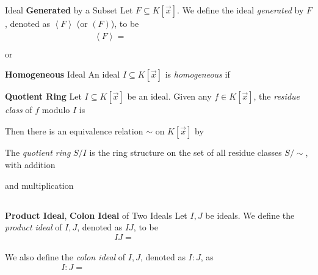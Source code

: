 \documentclass[11pt]{article}
\begin{document}
    \begin{definition}{Ideal \textbf{Generated} by a Subset}
        Let $F\subseteq K\left[ \vec{x} \right]$. We define the ideal \emph{generated} by $F$, denoted as $\left< F \right>$ (or $\left( F \right)$), to be
        \begin{equation*}
            \left< F \right> = \phantom{\bigcap^{}_{} \left\lbrace I\supseteq F: \text{$I$ is an ideal} \right\rbrace}
        \end{equation*}
        or 
    \end{definition}
    
    \begin{definition}{\textbf{Homogeneous} Ideal}
        An ideal $I\subseteq K\left[ \vec{x} \right]$ is \emph{homogeneous} if 
    \end{definition}
    
    \begin{definition}{\textbf{Quotient Ring}}
        Let $I\subseteq K\left[ \vec{x} \right]$ be an ideal. Given any $f\in K\left[ \vec{x} \right]$, the \emph{residue class} of $f$ modulo $I$ is
        \begin{equation*}
            \phantom{f+I = \left\lbrace f+i: i\in I \right\rbrace}
        \end{equation*}
        Then there is an equivalence relation $\sim$ on $K\left[ \vec{x} \right]$ by
        \begin{equation*}
            \phantom{f\sim g \iff f+I = g+I}
        \end{equation*}
        The \emph{quotient ring} $S /I$ is the ring structure on the set of all residue classes $S /\sim$, with addition
        \begin{equation*}
            \phantom{\left( f+I \right) + \left( g+I \right) = \left( f+g \right) + I}
        \end{equation*}
        and multiplication
        \begin{equation*}
            \phantom{\left( f+I \right)\left( g+I \right) = fg+I}
        \end{equation*}
    \end{definition}
    
    \begin{definition}{\textbf{Product Ideal}, \textbf{Colon Ideal} of Two Ideals}
        Let $I,J$ be ideals. We define the \emph{product ideal} of $I,J$, denoted as $IJ$, to be
        \begin{equation*}
            IJ = \phantom{\left< fg: f\in I, g\in J \right>}
        \end{equation*}

        We also define the \emph{colon ideal} of $I,J$, denoted as $I:J$, as
        \begin{equation*}
            I:J = \phantom{\left\lbrace f\in S: \forall j\in J\left[ fj\in I \right] \right\rbrace = \left\lbrace f\in S: fJ\subseteq I \right\rbrace}
        \end{equation*}
    \end{definition}
    
\end{document}
